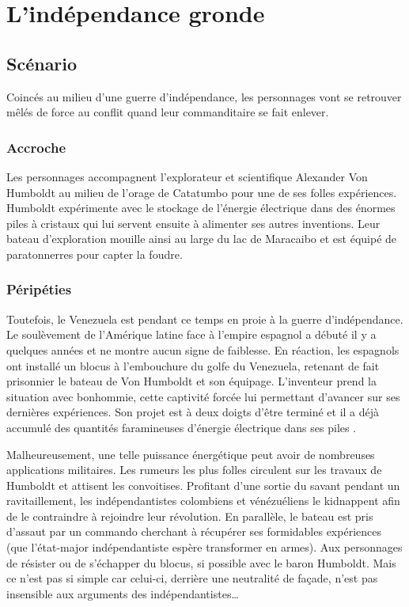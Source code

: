 \chapter{L'indépendance gronde}

\section{Scénario}

Coincés au milieu d'une guerre d'indépendance, les personnages vont se retrouver mêlés de force au conflit quand leur commanditaire se fait enlever.

\subsection{Accroche}

Les personnages accompagnent l'explorateur et scientifique Alexander Von Humboldt au milieu de l'orage de Catatumbo pour une de ses folles expériences.
Humboldt expérimente avec le stockage de l'énergie électrique dans des énormes piles à cristaux qui lui servent ensuite à alimenter ses autres inventions.
Leur bateau d'exploration mouille ainsi au large du lac de Maracaibo et est équipé de paratonnerres pour capter la foudre.

\subsection{Péripéties}

Toutefois, le Venezuela est pendant ce temps en proie à la guerre d'indépendance.
Le soulèvement de l'Amérique latine face à l'empire espagnol a débuté il y a quelques années et ne montre aucun signe de faiblesse.
En réaction, les espagnols ont installé un blocus à l'embouchure du golfe du Venezuela, retenant de fait prisonnier le bateau de Von Humboldt et son équipage.
L'inventeur prend la situation avec bonhommie, cette captivité forcée lui permettant d'avancer sur ses dernières expériences.
Son projet est à deux doigts d'être terminé et il a déjà accumulé des quantités faramineuses d'énergie électrique dans ses \og piles \fg.

Malheureusement, une telle puissance énergétique peut avoir de nombreuses applications militaires.
Les rumeurs les plus folles circulent sur les travaux de Humboldt et attisent les convoitises.
Profitant d'une sortie du savant pendant un ravitaillement, les indépendantistes colombiens et vénézuéliens le kidnappent afin de le contraindre à rejoindre leur révolution.
En parallèle, le bateau est pris d'assaut par un commando cherchant à récupérer ses formidables expériences (que l'état-major indépendantiste espère transformer en armes).
Aux personnages de résister ou de s'échapper du blocus, si possible avec le baron Humboldt.
Mais ce n'est pas si simple car celui-ci, derrière une neutralité de façade, n'est pas insensible aux arguments des indépendantistes\dots

